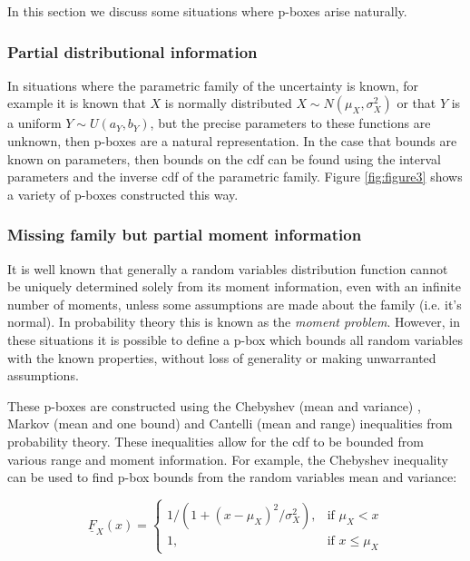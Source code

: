 \documentclass{juliacon}
\begin{document}
In this section we discuss some situations where p-boxes arise naturally.


\subsubsection{Partial distributional information} \hfill \break

In situations where the parametric family of the uncertainty is known, for example it is known that $X$ is normally distributed $X \sim N(\mu_{X}, \sigma_{X}^{2})$ or that $Y$ is a uniform $Y \sim U(a_{Y},b_{Y})$, but the precise parameters to these functions are unknown, then p-boxes are a natural representation. In the case that bounds are known on parameters, then bounds on the cdf can be found using the interval parameters and the inverse cdf of the parametric family. Figure \ref{fig:figure3} shows a variety of p-boxes constructed this way.


\subsubsection{Missing family but partial moment information} \hfill \break
\label{section:Moments}

It is well known that generally a random variables distribution function cannot be uniquely determined solely from its moment information, even with an infinite number of moments, unless some assumptions are made about the family (i.e. it's normal). In probability theory this is known as the \textit{moment problem}. However, in these situations it is possible to define a p-box which bounds all random variables with the known properties, without loss of generality or making unwarranted assumptions.

These p-boxes are constructed using the Chebyshev (mean and variance) \cite{chebyshev1874valeurs}, Markov (mean and one bound) \cite{markoff1900question} and Cantelli (mean and range) inequalities from probability theory. These inequalities allow for the cdf to be bounded from various range and moment information. For example, the Chebyshev inequality can be used to find p-box bounds from the random variables mean and variance:

\begin{equation*}
  \underline{F}_{X}(x) = \begin{cases} 1 / (1 + (x - \mu_{X})^2 / \sigma^{2}_{X}),& \text{if } \mu_{X}<x \\
    1,& \text{if } x\leq \mu_{X} \end{cases}
\end{equation*}
\end{document}
